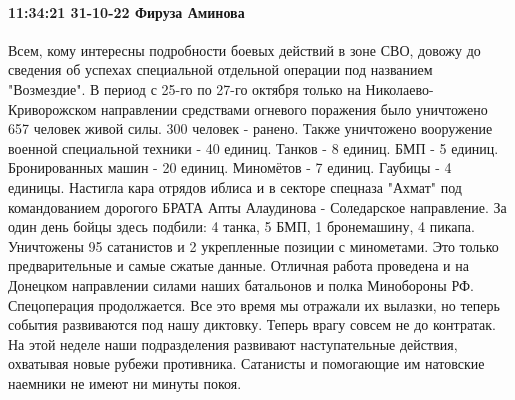  
 
 
 
 


\paragraph{11:34:21 31-10-22 Фируза Аминова}

Всем, кому интересны подробности боевых действий в зоне СВО, довожу до сведения об успехах специальной отдельной операции под названием "Возмездие".
В период с 25-го по 27-го октября только на Николаево-Криворожском направлении средствами огневого поражения было уничтожено 657 человек живой силы. 300 человек - ранено. Также уничтожено вооружение военной специальной техники - 40 единиц.
Танков - 8 единиц.
БМП - 5 единиц.
Бронированных машин - 20 единиц.
Миномётов - 7 единиц.
Гаубицы - 4 единицы.
Настигла кара отрядов иблиса и в секторе спецназа "Ахмат" под командованием дорогого БРАТА Апты Алаудинова - Соледарское направление. За один день бойцы здесь подбили:
4 танка,
5 БМП,
1 бронемашину,
4 пикапа.
Уничтожены 95 сатанистов и 2 укрепленные позиции с минометами. Это только предварительные и самые сжатые данные.
Отличная работа проведена и на Донецком направлении силами наших батальонов и полка Минобороны РФ. Спецоперация продолжается.
Все это время мы отражали их вылазки, но теперь события развиваются под нашу диктовку. Теперь врагу совсем не до контратак. На этой неделе наши подразделения развивают наступательные действия, охватывая новые рубежи противника. Сатанисты и помогающие им натовские наемники не имеют ни минуты покоя.

